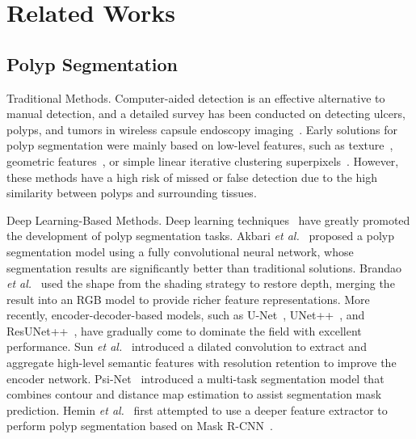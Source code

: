 \documentclass[journal]{IEEEtran}
\def\etal{\textit{et al.}}
\begin{document}
\section{Related Works} 
\subsection{Polyp Segmentation}\label{subsec:polyp segmentation}
\textcolor[RGB]{31,100,212}{Traditional Methods.} {Computer-aided detection is an effective alternative to manual detection, and a detailed survey has been conducted on detecting ulcers, polyps, and tumors in wireless capsule endoscopy imaging~\cite{rahim2020survey}.}
Early solutions for polyp segmentation were mainly based on low-level features, such as texture~\cite{mamonov2014automated}, geometric features~\cite{mamonov2014automated}, or simple linear iterative clustering superpixels~\cite{maghsoudi2017superpixel}.
However, these methods have a high risk of missed or false detection due to the high similarity between polyps and surrounding tissues.

\textcolor[RGB]{31,100,212}{Deep Learning-Based Methods.} Deep learning techniques~\cite{he2016deep,simonyan2015very,li2019selective,wang2018mixed,long2015fully,cai2022using,tomar2022tganet,zhang2022lesion,shi2022polyp,zhao2022semi} have greatly promoted
the development of polyp segmentation tasks. 
Akbari \etal~\cite{akbari2018polyp} proposed a polyp segmentation model using a fully convolutional neural network, whose segmentation results are significantly better than traditional solutions.
Brandao \etal~\cite{brandao2018towards} used the shape from the shading strategy to restore depth, merging the result into an RGB model to provide richer feature representations.
More recently, encoder-decoder-based models, such as U-Net~\cite{ronneberger2015unet}, UNet++~\cite{zhou2018unet++}, and ResUNet++~\cite{JhaSRJLHJ19}, have gradually come to dominate the field with excellent performance.
Sun \etal~\cite{sun2019colorectal} introduced a dilated convolution to extract and aggregate high-level semantic features with resolution retention to improve the encoder network.
Psi-Net~\cite{murugesan2019psi} introduced a multi-task segmentation model that combines contour and distance map estimation to assist segmentation mask prediction.
Hemin \etal~\cite{qadir2019polyp} first attempted to use a deeper feature extractor to perform polyp segmentation based on Mask R-CNN~\cite{he2017mask}.
\end{document}
